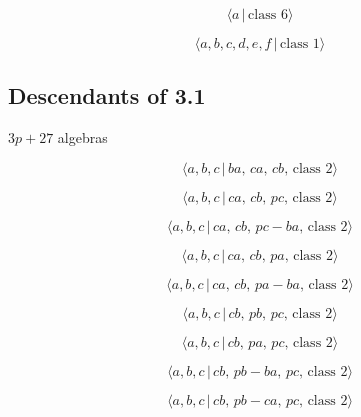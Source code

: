 \documentclass[10pt]{article}
\begin{document}
\begin{equation}
\langle a\,|\,\text{class }6\rangle  \tag{6.0}
\end{equation}

\begin{equation}
\langle a,b,c,d,e,f\,|\,\text{class }1\rangle  \tag{6.1}
\end{equation}

\subsection{Descendants of 3.1}

$3p+27$ algebras

\begin{equation}
\langle a,b,c\,|\,ba,\,ca,\,cb,\,\text{class }2\rangle  \tag{6.85}
\end{equation}

\begin{equation}
\langle a,b,c\,|\,ca,\,cb,\,pc,\,\text{class }2\rangle  \tag{6.86}
\end{equation}

\begin{equation}
\langle a,b,c\,|\,ca,\,cb,\,pc-ba,\,\text{class }2\rangle  \tag{6.87}
\end{equation}

\begin{equation}
\langle a,b,c\,|\,ca,\,cb,\,pa,\,\text{class }2\rangle  \tag{6.88}
\end{equation}

\begin{equation}
\langle a,b,c\,|\,ca,\,cb,\,pa-ba,\,\text{class }2\rangle  \tag{6.89}
\end{equation}

\begin{equation}
\langle a,b,c\,|\,cb,\,pb,\,pc,\,\text{class }2\rangle  \tag{6.90}
\end{equation}

\begin{equation}
\langle a,b,c\,|\,cb,\,pa,\,pc,\,\text{class }2\rangle  \tag{6.91}
\end{equation}

\begin{equation}
\langle a,b,c\,|\,cb,\,pb-ba,\,pc,\,\text{class }2\rangle  \tag{6.92}
\end{equation}

\begin{equation}
\langle a,b,c\,|\,cb,\,pb-ca,\,pc,\,\text{class }2\rangle  \tag{6.93}
\end{equation}
\end{document}
